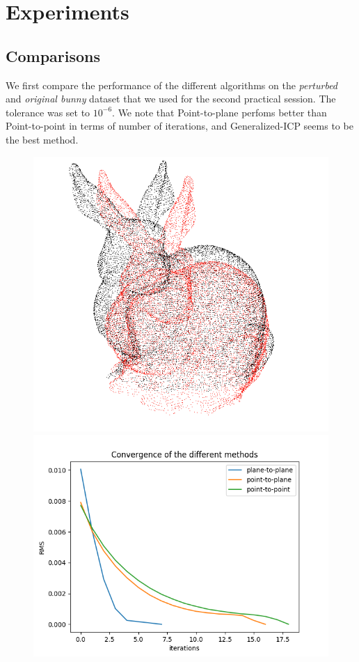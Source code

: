 \documentclass[11pt,letterpaper,leqno]{article}
\begin{document}
\section{Experiments}

\subsection{Comparisons}
We first compare the performance of the different algorithms on the \textit{perturbed} and \textit{original bunny} dataset that we used for the second practical session. The tolerance was set to $10^{-6}$. We note that Point-to-plane perfoms better than Point-to-point in terms of number of iterations, and Generalized-ICP seems to be the best method. 
\begin{figure}[ht!]
    \centering
    \begin{minipage}{0.5\linewidth}
    \includegraphics[width=\linewidth]{img/comparison_1_clouds.png}
    \end{minipage}\hfill
    \begin{minipage}{0.5\linewidth}
    \includegraphics[width=\linewidth]{img/comparison_1.png}

\end{minipage}
\end{figure}
\end{document}
